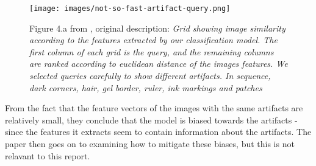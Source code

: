 \begin{figure}[h]
    \centering
    \texttt{[image: images/not-so-fast-artifact-query.png]}
    \caption{Figure 4.a from \cite{debias-not-so-fast}, original description: \textit{Grid showing image similarity according to the features extracted by our classification model. The first column
            of each grid is the query, and the remaining columns are ranked according to euclidean distance of the images features.
            We selected queries carefully to show different artifacts.
            In sequence, dark corners, hair, gel border, ruler, ink markings and patches}}
    \label{fig:not-so-fast-artifact-query}
\end{figure}

From the fact that the feature vectors of the images with the same artifacts are relatively small,
they conclude that the model is biased towards the artifacts - since the features it extracts seem to contain information about the artifacts.
The paper then goes on to examining how to mitigate these biases, but this is not relavant to this report.